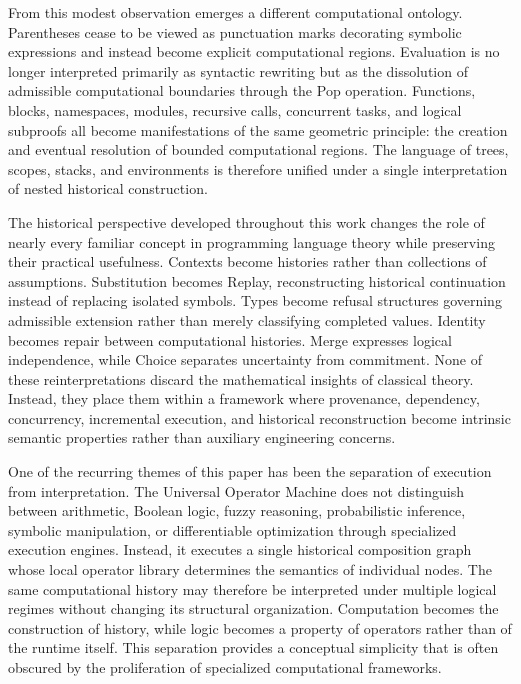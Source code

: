 \documentclass[12pt,oneside]{article}
\theoremstyle{definition}
\theoremstyle{remark}
\begin{document}
From this modest observation emerges a different computational ontology.
Parentheses cease to be viewed as punctuation marks decorating symbolic
expressions and instead become explicit computational regions. Evaluation is
no longer interpreted primarily as syntactic rewriting but as the dissolution
of admissible computational boundaries through the Pop operation. Functions,
blocks, namespaces, modules, recursive calls, concurrent tasks, and logical
subproofs all become manifestations of the same geometric principle: the
creation and eventual resolution of bounded computational regions. The
language of trees, scopes, stacks, and environments is therefore unified under
a single interpretation of nested historical construction.

The historical perspective developed throughout this work changes the role of
nearly every familiar concept in programming language theory while preserving
their practical usefulness. Contexts become histories rather than collections
of assumptions. Substitution becomes Replay, reconstructing historical
continuation instead of replacing isolated symbols. Types become refusal
structures governing admissible extension rather than merely classifying
completed values. Identity becomes repair between computational histories.
Merge expresses logical independence, while Choice separates uncertainty from
commitment. None of these reinterpretations discard the mathematical insights
of classical theory. Instead, they place them within a framework where
provenance, dependency, concurrency, incremental execution, and historical
reconstruction become intrinsic semantic properties rather than auxiliary
engineering concerns.

One of the recurring themes of this paper has been the separation of execution
from interpretation. The Universal Operator Machine does not distinguish
between arithmetic, Boolean logic, fuzzy reasoning, probabilistic inference,
symbolic manipulation, or differentiable optimization through specialized
execution engines. Instead, it executes a single historical composition graph
whose local operator library determines the semantics of individual nodes. The
same computational history may therefore be interpreted under multiple logical
regimes without changing its structural organization. Computation becomes the
construction of history, while logic becomes a property of operators rather
than of the runtime itself. This separation provides a conceptual simplicity
that is often obscured by the proliferation of specialized computational
frameworks.
\end{document}
